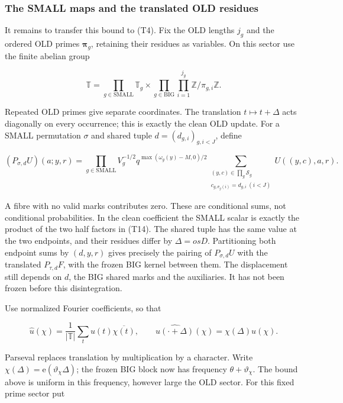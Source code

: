 
\hypertarget{marked-correlation-the-small-maps-and-the-translated-old-residues}{%
\subsubsection{The SMALL maps and the translated OLD
residues}\label{marked-correlation-the-small-maps-and-the-translated-old-residues}}

It remains to transfer this bound to (T4). Fix the OLD lengths \(j_g\)
and the ordered OLD primes \(\boldsymbol\pi_g\), retaining their
residues as variables. On this sector use the finite abelian group

\[
\mathbb T=\prod_{g\in\mathrm{SMALL}}\mathbb T_g
       \times\prod_{g\in\mathrm{BIG}}\prod_{i=1}^{j_g}
                                  \mathbb Z/\pi_{g,i}\mathbb Z.
\tag{T13}
\]

Repeated OLD primes give separate coordinates. The translation
\(t\mapsto t+\Delta\) acts diagonally on every occurrence; this is
exactly the clean OLD update. For a SMALL permutation \(\sigma\) and
shared tuple \(d=(d_{g,i})_{g,i<J}\), define

\[
(P_{\sigma,d}U)(a;y,r)=
 \prod_{g\in\mathrm{SMALL}}
    V_g^{-1/2}q^{\max(\omega_g(y)-M,0)/2}
 \sum_{\substack{(y,c)\in\prod_g\mathscr S_g\\
                   c_{g,\sigma_g(i)}=d_{g,i}\ (i<J)}}
          U((y,c),a,r).
\tag{T14}
\]

A fibre with no valid marks contributes zero. These are conditional
sums, not conditional probabilities. In the clean coefficient the SMALL
scalar is exactly the product of the two half factors in (T14). The
shared tuple has the same value at the two endpoints, and their residues
differ by \(\Delta=o sD\). Partitioning both endpoint sums by
\((d,y,r)\) gives precisely the pairing of \(P_{\sigma,d}U\) with the
translated \(P_{\tau,d}F\), with the frozen BIG kernel between them. The
displacement still depends on \(d\), the BIG shared marks and the
auxiliaries. It has not been frozen before this disintegration.

Use normalized Fourier coefficients, so that

\[
\widehat u(\chi)=\frac1{|\mathbb T|}\sum_tu(t)\overline{\chi(t)},
\qquad
\widehat{u(\cdot+\Delta)}(\chi)=\chi(\Delta)\widehat u(\chi).
\]

Parseval replaces translation by multiplication by a character. Write
\(\chi(\Delta)=\mathrm e(\vartheta_\chi\Delta)\); the frozen BIG block
now has frequency \(\theta+\vartheta_\chi\). The bound above is uniform
in this frequency, however large the OLD sector. For this fixed prime
sector put

